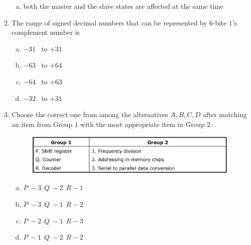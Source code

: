 \documentclass[journal,12pt,twocolumn]{IEEEtran}
\begin{document}
\begin{enumerate}
\begin{enumerate}[(a)]
\item both the master and the slave states are affected at the same time
\end{enumerate}

\item The range of signed decimal numbers that can be represented by $6$-bite $1$'s complement number is

\begin{enumerate}[(a)]
 
\item $
-31$ \ to $+31
$


\item $
-63$ \ to $+64
$


\item $
-64$ \ to $+63
$


\item $
-32$ \ to $+31
$
\end{enumerate}


\item Choose the correct one from among the alternatives $A,B,C,D$ after matching an item from Group $1$ with the most appropriate item in Group $2$.

\begin{figure}

\centering

\includegraphics[width=\columnwidth]{./figs/26.eps}

\caption{}

\label{fig:22}

\end{figure} 


\begin{enumerate}[(a)]
 
\item $
P \ - 3 \ \ Q \ - 2 \ \ R - 1
$

\item $
P \ - 3 \ \ Q \ - 1 \ \ R - 2
$

\item $
P \ - 2 \ \ Q \ - 1 \ \ R - 3
$

\item $
P \ - 1 \ \ Q \ - 2 \ \ R - 2
$

\end{enumerate}


\end{enumerate}
\end{document}
